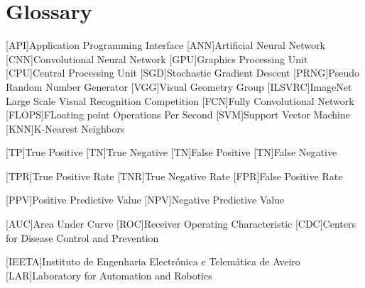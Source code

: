 \chapter{Glossary}

\footnotesize
\SingleSpacing

\begin{multicols}{2}
\begin{acronym}[AAAAAA]

	[API]{Application Programming Interface}
	[ANN]{Artificial Neural Network}
	[CNN]{Convolutional Neural Network}
	[GPU]{Graphics Processing Unit}
	[CPU]{Central Processing Unit}
	[SGD]{Stochastic Gradient Descent}
	[PRNG]{Pseudo Random Number Generator}
	[VGG]{Visual Geometry Group}
    [ILSVRC]{ImageNet Large Scale Visual Recognition Competition}
    [FCN]{Fully Convolutional Network}
    [FLOPS]{FLoating point Operations Per Second}
    [SVM]{Support Vector Machine}
    [KNN]{K-Nearest Neighbors}

    [TP]{True Positive}
    [TN]{True Negative}
    [TN]{False Positive}
    [TN]{False Negative}

    [TPR]{True Positive Rate}
    [TNR]{True Negative Rate}
    [FPR]{False Positive Rate}

    [PPV]{Positive Predictive Value}
    [NPV]{Negative Predictive Value}

    [AUC]{Area Under Curve}
    [ROC]{Receiver Operating Characteristic}
    [CDC]{Centers for Disease Control and Prevention}

    [IEETA]{Instituto de Engenharia Electrónica e Telemática de Aveiro}
    [LAR]{Laboratory for Automation and Robotics}

\end{acronym}
\end{multicols}
